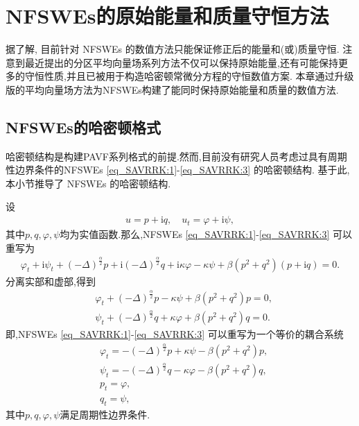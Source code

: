 \chapter[NFSWEs的原始能量和质量守恒方法]{NFSWEs的原始能量和质量守恒方法}
据了解, 目前针对 NFSWEs 的数值方法只能保证修正后的能量和(或)质量守恒.
注意到最近提出的分区平均向量场系列方法不仅可以保持原始能量,还有可能保持更多的守恒性质,并且已被用于构造哈密顿常微分方程的守恒数值方案\cite{caiPartitionedAveragedVector2018}.
本章通过升级版的平均向量场方法为NFSWEs构建了能同时保持原始能量和质量的数值方法.
\section{NFSWEs的哈密顿格式}\label{Section_PAVF: 2_1}

哈密顿结构是构建PAVF系列格式的前提.然而,目前没有研究人员考虑过具有周期性边界条件的NFSWEs \eqref{eq_SAVRRK:1}-\eqref{eq_SAVRRK:3} 的哈密顿结构.
基于此, 本小节推导了 NFSWEs 的哈密顿结构.

设
\begin{align}
u = p+\mathrm{i}q, \quad u_t = \varphi+ \mathrm{i}\psi,
\end{align}
其中$p, q,\varphi,\psi$均为实值函数.那么,NFSWEs \eqref{eq_SAVRRK:1}-\eqref{eq_SAVRRK:3} 可以重写为
\begin{align}\label{eq_PAVF:28}
\varphi_{t}+\mathrm{i}\psi_{t}+\left( -\Delta \right) ^{\frac{\alpha }{2}}p+\mathrm{i}\left( -\Delta \right) ^{\frac{\alpha }{2}}q+\mathrm{i}\kappa \varphi-\kappa \psi+\beta \left( p^{2}+q^{2}\right) \left( p+\mathrm{i} q\right) =0.
\end{align}
分离实部和虚部,得到
\begin{align}
&\varphi_{t}+\left( -\Delta \right) ^{\frac{\alpha }{2}}p-\kappa \psi+\beta \left( p^{2}+q^{2}\right)p=0,\nonumber\\
&\psi_{t}+\left( -\Delta \right) ^{\frac{\alpha }{2}}q+\kappa \varphi+\beta \left( p^{2}+q^{2}\right)q=0.\label{eq_PAVF:29}
\end{align}
即,NFSWEs \eqref{eq_SAVRRK:1}-\eqref{eq_SAVRRK:3} 可以重写为一个等价的耦合系统
\begin{align}
&\varphi_{t}=-\left( -\Delta \right) ^{\frac{\alpha }{2}}p+\kappa \psi-\beta \left( p^{2}+q^{2}\right)p\label{eq_PAVF:30},\\
&\psi_{t}=-\left( -\Delta \right) ^{\frac{\alpha }{2}}q-\kappa \varphi-\beta \left( p^{2}+q^{2}\right)q\label{eq_PAVF:31},\\
&p_t=\varphi, \label{eq_PAVF:32}\\
&q_t=\psi, \label{eq_PAVF:33}
\end{align}
其中$p, q,\varphi,\psi$满足周期性边界条件.

